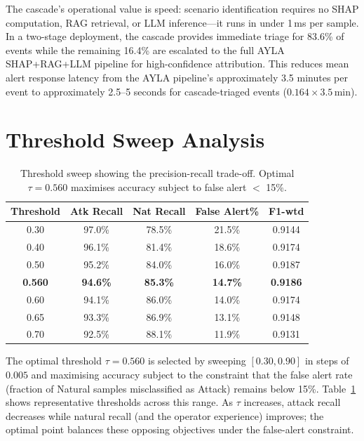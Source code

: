 \documentclass[twocolumn, 10pt, letterpaper]{article}
\begin{document}
The cascade's operational value is speed: scenario identification requires
no SHAP computation, RAG retrieval, or LLM inference---it runs in under 1\,ms
per sample.
In a two-stage deployment, the cascade provides immediate triage for 83.6\% of
events while the remaining 16.4\% are escalated to the full AYLA SHAP+RAG+LLM
pipeline for high-confidence attribution.
This reduces mean alert response latency from the AYLA pipeline's approximately
3.5 minutes per event to approximately 2.5--5 seconds for cascade-triaged events
($0.164 \times 3.5\,\text{min}$).

\section{Threshold Sweep Analysis}
\label{app:sweep}

\begin{table}[t]
\centering
\caption{Threshold sweep showing the precision-recall trade-off.
         Optimal $\tau{=}0.560$ maximises accuracy subject to false alert $<$ 15\%.}
\label{tab:sweep}
\begin{tabular}{ccccc}
\toprule
\textbf{Threshold} & \textbf{Atk Recall} & \textbf{Nat Recall} & \textbf{False Alert\%} & \textbf{F1-wtd} \\
\midrule
0.30 & 97.0\% & 78.5\% & 21.5\% & 0.9144 \\
0.40 & 96.1\% & 81.4\% & 18.6\% & 0.9174 \\
0.50 & 95.2\% & 84.0\% & 16.0\% & 0.9187 \\
\textbf{0.560} & \textbf{94.6\%} & \textbf{85.3\%} & \textbf{14.7\%} & \textbf{0.9186} \\
0.60 & 94.1\% & 86.0\% & 14.0\% & 0.9174 \\
0.65 & 93.3\% & 86.9\% & 13.1\% & 0.9148 \\
0.70 & 92.5\% & 88.1\% & 11.9\% & 0.9131 \\
\bottomrule
\end{tabular}
\end{table}

The optimal threshold $\tau{=}0.560$ is selected by sweeping $[0.30, 0.90]$ in
steps of $0.005$ and maximising accuracy subject to the constraint that the
false alert rate (fraction of Natural samples misclassified as Attack) remains
below 15\%.
Table~\ref{tab:sweep} shows representative thresholds across this range.
As $\tau$ increases, attack recall decreases while natural recall (and the
operator experience) improves; the optimal point balances these opposing objectives
under the false-alert constraint.
\end{document}
